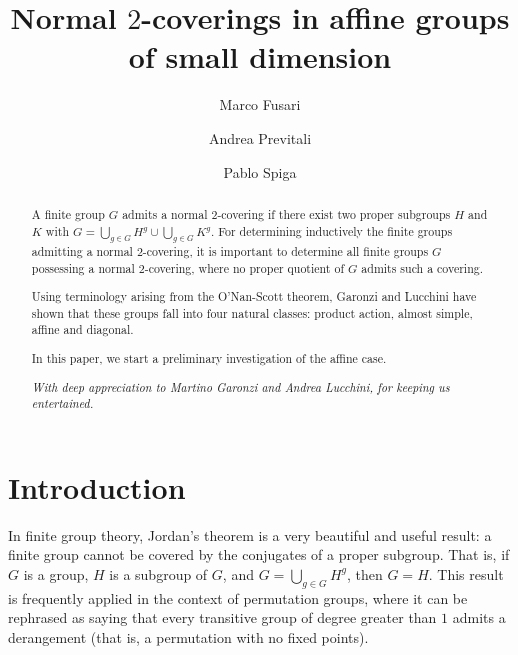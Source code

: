 \documentclass{amsart}
\begin{document}
\title[Normal $2$-coverings]{Normal $2$-coverings in affine groups of small dimension}

\author[M. Fusari]{Marco Fusari}
\address{Marco Fusari, Dipartimento di Matematica ``Felice Casorati", University of Pavia, Via Ferrata 5, 27100 Pavia, Italy}

\author[A.~Previtali]{Andrea Previtali}
\address{Andrea Previtali, Dipartimento di Matematica e Applicazioni, University of Milano-Bicocca, Via Cozzi 55, 20125 Milano, Italy}

\author[P.~Spiga]{Pablo Spiga}
\address{Pablo Spiga, Dipartimento di Matematica e Applicazioni, University of Milano-Bicocca, Via Cozzi 55, 20125 Milano, Italy}

\begin{abstract}
A finite group $G$ admits a normal $2$-covering if there exist two proper subgroups $H$ and $K$ with $G=\bigcup_{g\in G}H^g\cup\bigcup_{g\in G}K^g$. For determining inductively the finite groups admitting a normal $2$-covering, it is important to determine all finite groups $G$ possessing a normal $2$-covering, where no proper quotient of $G$ admits such a covering. 

Using terminology arising from the O'Nan-Scott theorem, Garonzi and Lucchini have shown that these groups fall into four natural classes: product action, almost simple, affine and diagonal.

In this paper, we start a preliminary investigation of the affine case.  

\begin{center}
\textit{With deep appreciation to Martino Garonzi and Andrea Lucchini, for keeping us entertained.}
\end{center}
\end{abstract}




\maketitle
\section{Introduction}\label{intro}
In finite group theory, Jordan's theorem is a very beautiful and useful result: a finite group cannot be covered by the conjugates of a proper subgroup. That is, if $G$ is a group, $H$ is a subgroup of $G$, and $G = \bigcup_{g \in G} H^g$, then  $G = H$. This result is frequently applied in the context of permutation groups, where it can be rephrased as saying that every transitive group of degree greater than $1$ admits a derangement (that is, a permutation with no fixed points).
\end{document}
